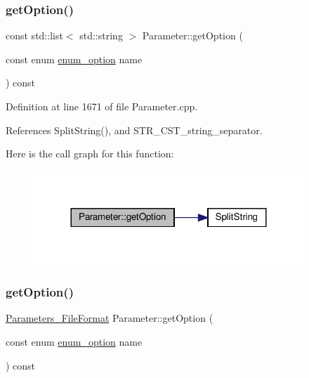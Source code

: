 \subsubsection{\texorpdfstring{get\+Option()}{getOption()}\hspace{0.1cm}{\footnotesize\ttfamily [7/8]}}
{\footnotesize\ttfamily const std\+::list$<$ std\+::string $>$ Parameter\+::get\+Option (\begin{DoxyParamCaption}\item[{const enum \hyperlink{Parameter_8hpp_a6d9441db52e537f5588658b218875976}{enum\+\_\+option}}]{name }\end{DoxyParamCaption}) const}



Definition at line 1671 of file Parameter.\+cpp.



References Split\+String(), and S\+T\+R\+\_\+\+C\+S\+T\+\_\+string\+\_\+separator.

Here is the call graph for this function\+:
\nopagebreak
\begin{figure}[H]
\begin{center}
\leavevmode
\includegraphics[width=288pt]{dc/dab/classParameter_a1bcc58ccd8eab01e839ad9bb7ae68787_cgraph}
\end{center}
\end{figure}
\mbox{\label{classParameter_a043bb297ec248aa92ee9078cfe2907ec}} 
\subsubsection{\texorpdfstring{get\+Option()}{getOption()}\hspace{0.1cm}{\footnotesize\ttfamily [8/8]}}
{\footnotesize\ttfamily \hyperlink{Parameter_8hpp_a67fa05fdc413fd22ad4f96d04e4f99f1}{Parameters\+\_\+\+File\+Format} Parameter\+::get\+Option (\begin{DoxyParamCaption}\item[{const enum \hyperlink{Parameter_8hpp_a6d9441db52e537f5588658b218875976}{enum\+\_\+option}}]{name }\end{DoxyParamCaption}) const}



